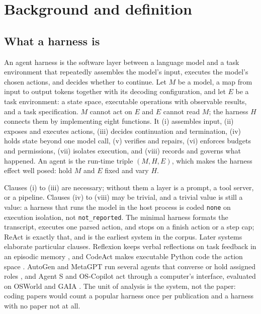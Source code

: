 \section{Background and definition}
\label{sec:background}

\subsection{What a harness is}
\label{subsec:definition}

An agent harness is the software layer between a language model and a task environment that
repeatedly assembles the model's input, executes the model's chosen actions, and decides whether to
continue. Let $M$ be a model, a map from input to output tokens together with its decoding
configuration, and let $E$ be a task environment: a state space, executable operations with observable
results, and a task specification. $M$ cannot act on $E$ and $E$ cannot read $M$; the harness $H$
connects them by implementing eight functions. It (i) assembles input, (ii) exposes and executes
actions, (iii) decides continuation and termination, (iv) holds state beyond one model call,
(v) verifies and repairs, (vi) enforces budgets and permissions, (vii) isolates execution, and
(viii) records and governs what happened. An agent is the run-time triple $(M, H, E)$, which makes the
harness effect well posed: hold $M$ and $E$ fixed and vary $H$.

Clauses (i) to (iii) are necessary; without them a layer is a prompt, a tool server, or a pipeline.
Clauses (iv) to (viii) may be trivial, and a trivial value is still a value: a harness that runs the
model in the host process is coded \texttt{none} on execution isolation, not \texttt{not\_reported}.
The minimal harness formats the transcript, executes one parsed action, and stops on a finish action
or a step cap; ReAct \citep{yao2023react} is exactly that, and is the earliest system in the corpus.
Later systems elaborate particular clauses. Reflexion keeps verbal reflections on task feedback in an
episodic memory \citep{shinn2023reflexion}, and CodeAct makes executable Python code the action space
\citep{wang2024codeact}. AutoGen and MetaGPT run several agents that converse or hold assigned roles
\citep{wu2023autogen,hong2023metagpt}, and Agent S and OS-Copilot act through a computer's interface,
evaluated on OSWorld and GAIA \citep{agashe2024agents,wu2024oscopilot,xie2024osworld,mialon2023gaia}.
The unit of analysis is the system, not the paper: coding papers would count a popular harness once
per publication and a harness with no paper not at all.

